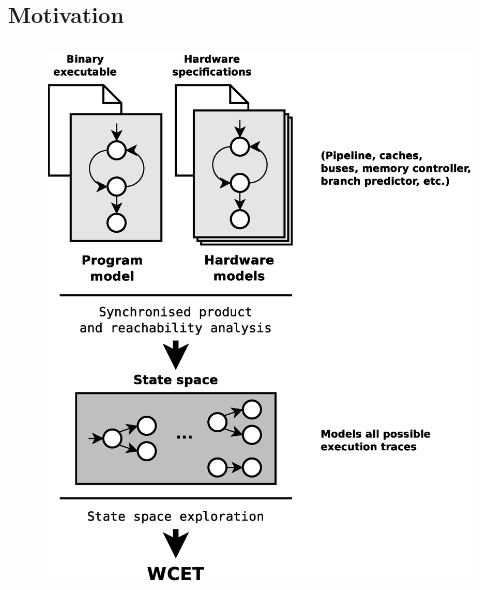 \documentclass{beamer}
\begin{document}
  \subsection{Motivation}
  \begin{frame}
    \frametitle{\secname}
    \framesubtitle{\subsecname}
    
    \begin{figure}
      \centering
      \includegraphics[height=.85\textheight]{fig/model-checking.eps}
    \end{figure}
  \end{frame}
\end{document}
